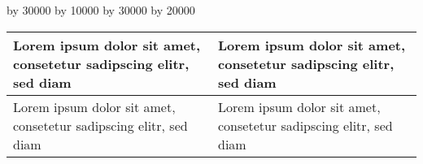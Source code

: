 
\begin{table}[htb]
\centering

\ifthenelse{\isundefined{\tabLenA}}{\newlength{\tabLenA}}{}
\ifthenelse{\isundefined{\tabLenB}}{\newlength{\tabLenB}}{}

\setlength{\tabLenA}{\textwidth}
\setlength{\tabLenB}{\textwidth}

\divide\tabLenA by 30000
\multiply\tabLenA by 10000
\divide\tabLenB by 30000
\multiply\tabLenB by 20000
\begin{tabular}{|p{\tabLenA}|p{\tabLenB}|}
\hline

Lorem ipsum dolor sit amet, consetetur sadipscing elitr, sed diam
&

Lorem ipsum dolor sit amet, consetetur sadipscing elitr, sed diam
\\
\hline

Lorem ipsum dolor sit amet, consetetur sadipscing elitr, sed diam
&

Lorem ipsum dolor sit amet, consetetur sadipscing elitr, sed diam
\\
\hline
\end{tabular}
\end{table}
